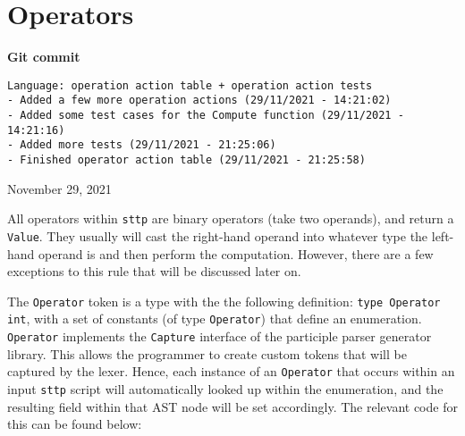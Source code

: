 \section{Operators}

\begin{center}
    \textbf{Git commit}
    \begin{verbatim}
Language: operation action table + operation action tests
- Added a few more operation actions (29/11/2021 - 14:21:02)
- Added some test cases for the Compute function (29/11/2021 - 14:21:16)
- Added more tests (29/11/2021 - 21:25:06)
- Finished operator action table (29/11/2021 - 21:25:58)
    \end{verbatim}
    \vspace{-1em}
    \tiny{November 29, 2021}
\end{center}

All operators within \verb|sttp| are binary operators (take two operands), and return a \verb|Value|. They usually will cast the right-hand operand into whatever type the left-hand operand is and then perform the computation. However, there are a few exceptions to this rule that will be discussed later on.

The \verb|Operator| token is a type with the the following definition: \texttt{type Operator int}, with a set of constants (of type \verb|Operator|) that define an enumeration. \verb|Operator| implements the \verb|Capture| interface of the participle parser generator library. This allows the programmer to create custom tokens that will be captured by the lexer. Hence, each instance of an \verb|Operator| that occurs within an input \verb|sttp| script will automatically looked up within the enumeration, and the resulting field within that AST node will be set accordingly. The relevant code for this can be found below:

\inputminted[firstline=13, lastline=71, autogobble, breaklines, tabsize=4]{go}{../../src/eval/operators.go}

